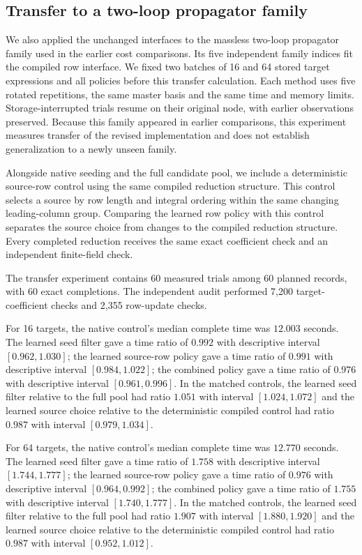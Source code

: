\subsection{Transfer to a two-loop propagator family}
We also applied the unchanged interfaces to the massless two-loop
propagator family used in the earlier cost comparisons. Its five
independent family indices fit the compiled row interface. We fixed
two batches of 16 and 64 stored target expressions and all policies
before this transfer calculation. Each method uses five rotated
repetitions, the same master basis and the same time and memory limits.
Storage-interrupted trials resume on their original node, with earlier
observations preserved. Because this family appeared in earlier
comparisons, this experiment measures transfer of the revised
implementation and does not establish generalization to a newly unseen
family.

Alongside native seeding and the full candidate pool, we include a
deterministic source-row control using the same compiled reduction
structure. This control selects a source by row length and integral ordering
within the same changing leading-column group. Comparing the learned row policy
with this control separates the source choice from changes to the
compiled reduction structure. Every completed reduction receives the
same exact coefficient check and an independent finite-field check.

The transfer experiment contains 60 measured trials among 60 planned records, with 60 exact completions. The independent audit performed 7,200 target-coefficient checks and 2,355 row-update checks.

For 16 targets, the native control's median complete time was $12.003$ seconds. The learned seed filter gave a time ratio of $0.992$ with descriptive interval $[0.962,1.030]$; the learned source-row policy gave a time ratio of $0.991$ with descriptive interval $[0.984,1.022]$; the combined policy gave a time ratio of $0.976$ with descriptive interval $[0.961,0.996]$. In the matched controls, the learned seed filter relative to the full pool had ratio $1.051$ with interval $[1.024,1.072]$ and the learned source choice relative to the deterministic compiled control had ratio $0.987$ with interval $[0.979,1.034]$.

For 64 targets, the native control's median complete time was $12.770$ seconds. The learned seed filter gave a time ratio of $1.758$ with descriptive interval $[1.744,1.777]$; the learned source-row policy gave a time ratio of $0.976$ with descriptive interval $[0.964,0.992]$; the combined policy gave a time ratio of $1.755$ with descriptive interval $[1.740,1.777]$. In the matched controls, the learned seed filter relative to the full pool had ratio $1.907$ with interval $[1.880,1.920]$ and the learned source choice relative to the deterministic compiled control had ratio $0.987$ with interval $[0.952,1.012]$.


